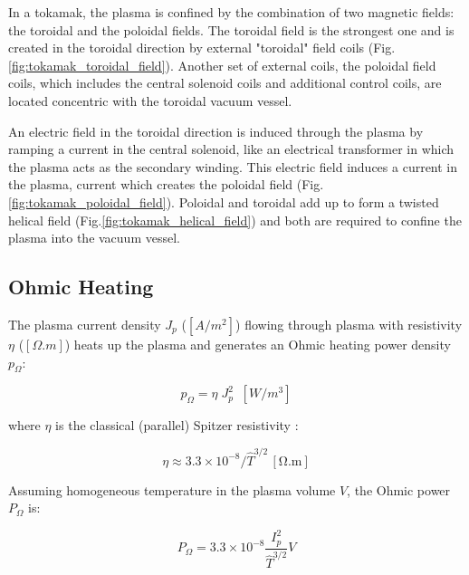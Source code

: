 In a tokamak, the plasma is confined by the combination of two magnetic fields: the toroidal and the poloidal fields. The toroidal field is the strongest one and is created in the toroidal direction by external "toroidal" field coils (Fig.\ref{fig:tokamak_toroidal_field}). Another set  of  external  coils, the poloidal field coils, which includes the central solenoid coils and additional control coils, are located concentric with the toroidal vacuum vessel.

An electric field in the toroidal direction is induced through the plasma by ramping a current in the central solenoid, like an electrical transformer in which the plasma acts as the secondary winding. This electric field induces a current in the plasma, current which creates the poloidal field (Fig.\ref{fig:tokamak_poloidal_field}). Poloidal and toroidal add up to form a twisted helical field (Fig.\ref{fig:tokamak_helical_field}) and both are required to confine the plasma into the vacuum vessel. 





\subsection{Ohmic Heating}
The plasma current density $J_p$ ($[\si{A/m^2}]$) flowing through plasma with resistivity $\eta$ ($[\si{\Omega.m}]$) heats up the plasma and generates an Ohmic heating power density $p_\Omega$:

\begin{equation}\label{eq:ohmic_power_density}
p_\Omega = \eta \; J_p^2 \;\; \si{[W/m^3]}
\end{equation}

where $\eta$ is the classical (parallel) Spitzer resistivity \cite[Eq.(11.15)]{Freidberg2007}:

\begin{equation}\label{eq:Spitzer_resistivity}
\eta
\approx
3.3 \times 10^{-8} / \hat T^{3/2}  \, \mathrm{[\Omega.m]}
\end{equation}


Assuming homogeneous temperature in the plasma volume $V$, the Ohmic power $P_\Omega$ is:

\begin{equation}\label{eq:ohmic_power}
P_\Omega
=
3.3 \times 10^{-8} \frac{ I_p^2 }{ \hat T^{3/2} } V
\end{equation}


